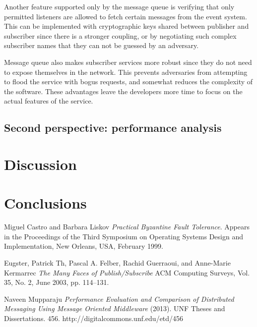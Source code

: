 \documentclass[conference]{IEEEtran}
\begin{document}
Another feature supported only by the message queue is verifying that only permitted listeners are allowed to fetch certain messages from the event system. This can be implemented with cryptographic keys shared between publisher and subscriber since there is a stronger coupling, or by negotiating such complex subscriber names that they can not be guessed by an adversary.

Message queue also makes subscriber services more robust since they do not need to expose themselves in the network. This prevents adversaries from attempting to flood the service with bogus requests, and somewhat reduces the complexity of the software. These advantages leave the developers more time to focus on the actual features of the service.

\subsection{Second perspective: performance analysis}

\section{Discussion}

\section{Conclusions}

{}

\begin{thebibliography}{9}
Miguel Castro and Barbara Liskov
\textit{Practical Byzantine Fault Tolerance}. 
Appears in the Proceedings of the Third Symposium on Operating Systems Design and Implementation, New Orleans, USA, February 1999.

Eugster, Patrick Th, Pascal A. Felber, Rachid Guerraoui, and Anne-Marie Kermarrec
\textit{The Many Faces of Publish/Subscribe}
ACM Computing Surveys, Vol. 35, No. 2, June 2003, pp. 114–131.
 
Naveen Mupparaju
\textit{Performance Evaluation and Comparison of Distributed Messaging Using Message Oriented Middleware}
(2013). UNF Theses and Dissertations. 456.
http://digitalcommons.unf.edu/etd/456
 
\end{thebibliography}
\end{document}
